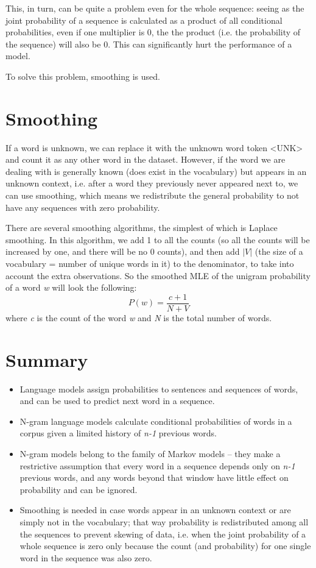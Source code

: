 This, in turn, can be quite a problem even for the whole sequence: seeing as the joint probability of a sequence is calculated as a product of all conditional probabilities, even if one multiplier is 0, the the product (i.e. the probability of the sequence) will also be 0. This can significantly hurt the performance of a model.

To solve this problem, smoothing is used.

\section{Smoothing}
\label{sec:NgramBackground-Smoothing}
If a word is unknown, we can replace it with the unknown word token <UNK> and count it as any other word in the dataset. However, if the word we are dealing with is generally known (does exist in the vocabulary) but appears in an unknown context, i.e. after a word they previously never appeared next to, we can use smoothing, which means we redistribute the general probability to not have any sequences with zero probability.  

There are several smoothing algorithms, the simplest of which is Laplace smoothing. In this algorithm, we add 1 to all the counts (so all the counts will be increased by one, and there will be no 0 counts), and then add $|V|$ (the size of a vocabulary = number of unique words in it) to the denominator, to take into account the extra observations. So the smoothed MLE of the unigram probability of a word \textit{w} will look the following:
\begin{equation}
    P(w)=\frac{c+1}{N+V}
\end{equation}
where \textit{c} is the count of the word \textit{w} and \textit{N} is the total number of words.

\section{Summary}
\label{sec:NgramBackground-Summary}
\begin{itemize}
    \item Language models assign probabilities to sentences and sequences of words, and can be used to predict next word in a sequence.
    \item N-gram language models calculate conditional probabilities of words in a corpus given a limited history of \textit{n-1} previous words.
    \item N-gram models belong to the family of Markov models -- they make a restrictive assumption that every word in a sequence depends only on \textit{n-1} previous words, and any words beyond that window have little effect on probability and can be ignored.
    \item Smoothing is needed in case words appear in an unknown context or are simply not in the vocabulary; that way probability is redistributed among all the sequences to prevent skewing of data, i.e. when the joint probability of a whole sequence is zero only because the count (and probability) for one single word in the sequence was also zero.
\end{itemize}